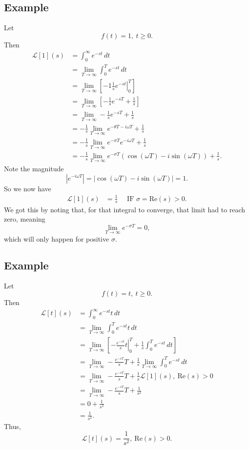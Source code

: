 \documentclass[11pt]{article}
\newcommand{\Laplace}{\mathscr{L}}
\begin{document}
\subsection{Example}
Let
\[ f(t) = 1,\ t \geq 0. \]
Then
\begin{align*}
\Laplace[1](s) &= \int_0^\infty e^{-st}\, dt \\
&= \lim_{T \rightarrow \infty} \int_0^T e^{-st}\, dt \\
&= \lim_{T \rightarrow \infty} \left[\left. -1\frac{1}{s}e^{-st} \right|_0^T \right] \\
&= \lim_{T \rightarrow \infty} \left[-\frac{1}{s}e^{-sT} + \frac{1}{s} \right] \\
&= \lim_{T \rightarrow \infty}-\frac{1}{s}e^{-sT} + \frac{1}{s} \\
&= -\frac{1}{s} \lim_{T \rightarrow \infty} e^{-\theta T - i\omega T} + \frac{1}{s} \\
&= -\frac{1}{s} \lim_{T \rightarrow \infty} e^{-\sigma T} e^{-i\omega T} + \frac{1}{s} \\
&= -\frac{1}{s} \lim_{T \rightarrow \infty} e^{-\sigma T} (\cos(\omega T) - i\sin(\omega T)) + \frac{1}{s}.
\end{align*}
Note the magnitude
\[ \left| e^{-i\omega T} \right| = |\cos(\omega T) - i\sin(\omega T)| = 1. \]
So we now have
\begin{align*}
\Laplace[1](s) &= \frac{1}{s} \quad \text{ IF } \sigma = \text{Re}(s) > 0.
\end{align*}
We got this by noting that, for that integral to converge, that limit had to reach zero, meaning
\[ \lim_{T \rightarrow \infty} e^{-\sigma T} = 0, \]
which will only happen for positive $\sigma$.

\subsection{Example}
Let
\[ f(t) = t,\ t\geq 0. \]
Then
\begin{align*}
\Laplace[t](s) &= \int_0^\infty e^{-st} t \, dt \\
&= \lim_{T \rightarrow \infty} \int_0^T e^{-st} t \, dt \\
&= \lim_{T \rightarrow \infty} \left[ \left. -\frac{e^{-st}}{s}t \right|_0^T + \frac{1}{s} \int_0^T e^{-st}\, dt \right] \\
&= \lim_{T \rightarrow \infty} -\frac{e^{-sT}}{s}T + \frac{1}{s}\lim_{T \rightarrow \infty} \int_0^T e^{-st}\, dt \\
&=\lim_{T \rightarrow \infty} -\frac{e^{-sT}}{s}T + \frac{1}{s} \Laplace[1](s),\ \text{Re}(s) > 0 \\
&= \lim_{T \rightarrow \infty} -\frac{e^{-sT}}{s}T + \frac{1}{s^2} \\
&= 0 + \frac{1}{s^2} \\
&= \frac{1}{s^2}.
\end{align*}
Thus,
\[ \Laplace[t](s) = \frac{1}{s^2},\ \text{Re}(s) > 0. \]
\end{document}
